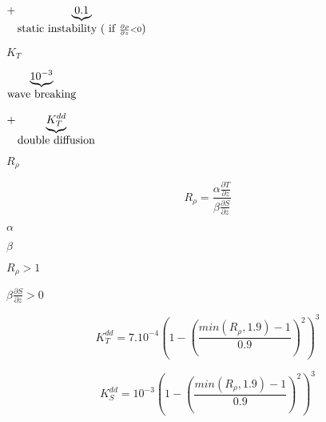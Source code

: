 {\newpage\clearpage
{}%
$\displaystyle +
\underbrace{0.1}_{\hbox{static instability ( if }
\frac{\partial \rho}{\partial z}< 0 \hbox{)}}$%
\lthtmlindisplaymathZ
\lthtmlcheckvsize\clearpage}

{\newpage\clearpage
{}%
$\displaystyle K_T$%
\lthtmlindisplaymathZ
\lthtmlcheckvsize\clearpage}

{\newpage\clearpage
{}%
$\displaystyle \underbrace{10^{-3}}_{\hbox{wave breaking}}$%
\lthtmlindisplaymathZ
\lthtmlcheckvsize\clearpage}

{\newpage\clearpage
{}%
$\displaystyle +
\underbrace{K_T^{dd}}_{\hbox{double diffusion}}$%
\lthtmlindisplaymathZ
\lthtmlcheckvsize\clearpage}

{\newpage\clearpage
{}%
$R_\rho$%
\lthtmlinlinemathZ
\lthtmlcheckvsize\clearpage}

{\newpage\clearpage
{}%
\begin{displaymath}
R_\rho=\frac{\alpha \frac{\partial T}{\partial z}}
{\beta \frac{\partial S}{\partial z}}
\end{displaymath}%
\lthtmldisplayZ
\lthtmlcheckvsize\clearpage}

{\newpage\clearpage
{}%
$\alpha$%
\lthtmlinlinemathZ
\lthtmlcheckvsize\clearpage}

{\newpage\clearpage
{}%
$\beta$%
\lthtmlinlinemathZ
\lthtmlcheckvsize\clearpage}

{\newpage\clearpage
{}%
$R_\rho>1$%
\lthtmlinlinemathZ
\lthtmlcheckvsize\clearpage}

{\newpage\clearpage
{}%
$\beta \frac{\partial S}{\partial z}>0$%
\lthtmlinlinemathZ
\lthtmlcheckvsize\clearpage}

{\newpage\clearpage
{}%
\begin{displaymath}
K_T^{dd} =  7.10^{-4}\left(1-\left(\frac{min(R_\rho,1.9)-1}{0.9}
\right)^2\right)^3
\end{displaymath}%
\lthtmldisplayZ
\lthtmlcheckvsize\clearpage}

{\newpage\clearpage
{}%
\begin{displaymath}
K_S^{dd} =  10^{-3}\left(1-\left(\frac{min(R_\rho,1.9)-1}{0.9}
\right)^2\right)^3
\end{displaymath}%
\lthtmldisplayZ
\lthtmlcheckvsize\clearpage}

